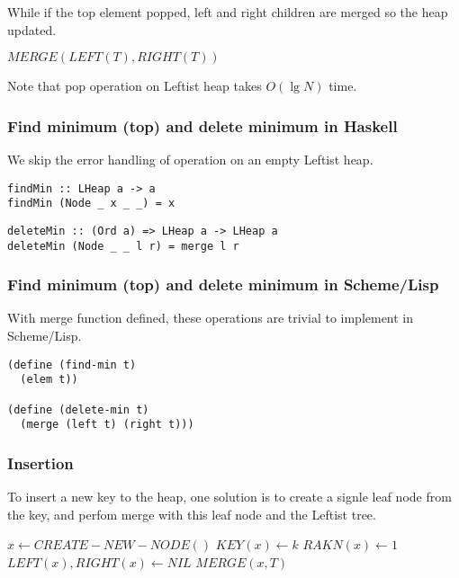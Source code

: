 \documentclass{article}
\begin{document}
While if the top element popped, left and right children are merged
so the heap updated.

\begin{algorithmic}[1]
  \State \Return $MERGE(LEFT(T), RIGHT(T))$
\EndFunction
\end{algorithmic}

Note that pop operation on Leftist heap takes $O(\lg N)$ time.

\subsubsection*{Find minimum (top) and delete minimum in Haskell}

We skip the error handling of operation on an empty 
Leftist heap.

\lstset{language=Haskell}
\begin{lstlisting}
findMin :: LHeap a -> a
findMin (Node _ x _ _) = x
\end{lstlisting}

\begin{lstlisting}
deleteMin :: (Ord a) => LHeap a -> LHeap a
deleteMin (Node _ _ l r) = merge l r
\end{lstlisting}

\subsubsection*{Find minimum (top) and delete minimum in Scheme/Lisp}

With merge function defined, these operations are trivial to implement
in Scheme/Lisp.

\lstset{language=lisp}
\begin{lstlisting}
(define (find-min t)
  (elem t))

(define (delete-min t)
  (merge (left t) (right t)))
\end{lstlisting}

\subsubsection{Insertion}

To insert a new key to the heap, one solution is to create a signle
leaf node from the key, and perfom merge with this leaf node and
the Leftist tree.

\begin{algorithmic}[1]
  \State $x \gets CREATE-NEW-NODE()$
  \State $KEY(x) \gets k$
  \State $RAKN(x) \gets 1$
  \State $LEFT(x), RIGHT(x) \gets NIL$
  \State \Return $MERGE(x, T)$
\EndFunction
\end{algorithmic}
\end{document}

